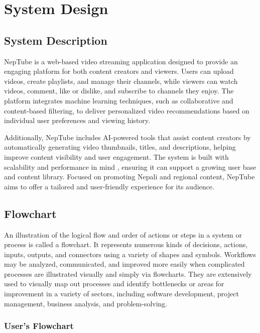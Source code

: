 \chapter{System Design}

\section{System Description}

NepTube is a web-based video streaming application designed to provide an engaging platform for both content creators and viewers. Users can upload videos, create playlists, and manage their channels, while viewers can watch videos, comment, like or dislike, and subscribe to channels they enjoy. The platform integrates machine learning techniques, such as collaborative and content-based filtering, to deliver personalized video recommendations based on individual user preferences and viewing history.

Additionally, NepTube includes AI-powered tools that assist content creators by automatically generating video thumbnails, titles, and descriptions, helping improve content visibility and user engagement. The system is built with scalability and performance in mind \cite{choi2023qoe}, ensuring it can support a growing user base and content library. Focused on promoting Nepali and regional content, NepTube aims to offer a tailored and user-friendly experience for its audience.

\section{Flowchart}

An illustration of the logical flow and order of actions or steps in a system or process is called a flowchart. It represents numerous kinds of decisions, actions, inputs, outputs, and connectors using a variety of shapes and symbols. Workflows may be analyzed, communicated, and improved more easily when complicated processes are illustrated visually and simply via flowcharts. They are extensively used to visually map out processes and identify bottlenecks or areas for improvement in a variety of sectors, including software development, project management, business analysis, and problem-solving.

\subsection{User's Flowchart}


